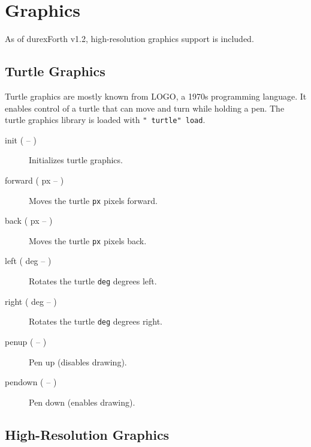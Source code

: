 \chapter{Graphics}

As of durexForth v1.2, high-resolution graphics support is included.

\section{Turtle Graphics}

Turtle graphics are mostly known from LOGO, a 1970s programming language.
It enables control of a turtle that can move and turn while holding a pen.
The turtle graphics library is loaded with \texttt{" turtle" load}.

\begin{description}
\item[init ( -- )] Initializes turtle graphics.
\item[forward ( px -- )] Moves the turtle \texttt{px} pixels forward.
\item[back ( px -- )] Moves the turtle \texttt{px} pixels back.
\item[left ( deg -- )] Rotates the turtle \texttt{deg} degrees left.
\item[right ( deg -- )] Rotates the turtle \texttt{deg} degrees right.
\item[penup ( -- )] Pen up (disables drawing).
\item[pendown ( -- )] Pen down (enables drawing).
\end{description}

\section{High-Resolution Graphics}

